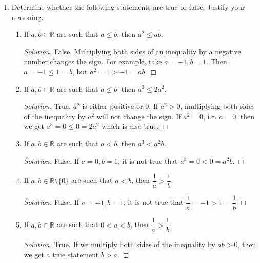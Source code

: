 \documentclass[12pt]{article}
\newenvironment{solution}{\begin{proof}[Solution]}{\end{proof}}
\begin{document}
\begin{enumerate}
\begin{enumerate}
\begin{solution}
				We can use a sign chart as previously to solve the inequality. However, notice that $(x+3)^2\geq 0$ for all $x\in\mathbb{R}$, so we only need to find the $x$ such that $x-1>0$ i.e., $x>1$. Thus, the solution is $(1,\infty)$.
			\end{solution}
		\end{enumerate}
		
		
		
		\item Determine whether the following statements are true or false. Justify your reasoning.
		
		
		
		\begin{enumerate}
			\item If $a,b\in \mathbb{R}$ are such that $a\leq b$, then $a^2\leq ab$.
			\begin{solution}
				False. Multiplying both sides of an inequality by a negative number changes the sign. For example, take $a=-1,b=1$. Then $a=-1\leq 1=b$, but $a^2=1>-1=ab$.
			\end{solution}
			\item If $a,b\in \mathbb{R}$ are such that $a\leq b$, then $a^3\leq 2a^2$.
			\begin{solution}
				True. $a^2$ is either positive or $0$. If $a^2>0$, multiplying both sides of the inequality by $a^2$ will not change the sign. If $a^2=0$, i.e. $a=0$, then we get $a^3=0\leq0=2a^2$ which is also true.
			\end{solution}
			\item If $a,b\in \mathbb{R}$ are such that $a< b$, then $a^3< a^2b$.
			\begin{solution}
				False. If $a=0, b=1$, it is not true that $a^3=0 < 0=a^2b$.
			\end{solution}
			\item If $a,b\in \mathbb{R}\setminus\{0\}$ are such that $a< b$, then $\dfrac{1}{a}>\dfrac{1}{b}$.
			\begin{solution}
				False. If $a=-1, b=1$, it is not true that $\dfrac{1}{a}=-1 > 1=\dfrac{1}{b}$
			\end{solution}
			\item If $a,b\in \mathbb{R}$ are such that $0<a< b$, then $\dfrac{1}{a}>\dfrac{1}{b}$.
			\begin{solution}
				True. If we multiply both sides of the inequality by $ab>0$, then we get a true statement $b>a$.
			\end{solution}
			\end{enumerate}
			\end{enumerate}
			
\end{document}
